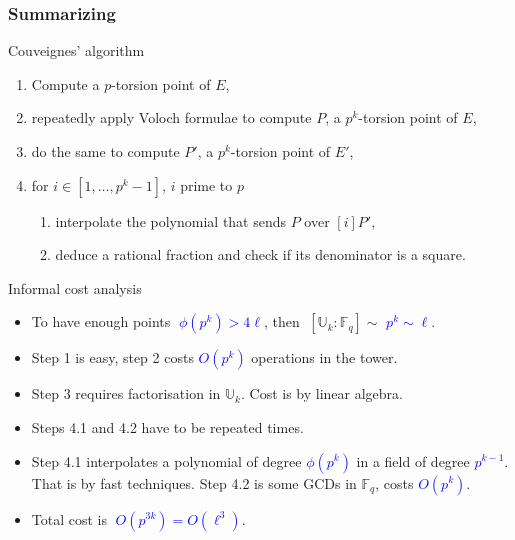 \documentclass[10pt]{beamer}
\newcommand{\blue}[1]{\textcolor{blue}{#1}}  %
\newcommand{\U}{\mathbb{U}}  %
\newcommand{\F}{\mathbb{F}}  %
\newcommand{\euler}{\phi}  %
\newcommand{\0}{\mathcal{O}}  %
\begin{document}
\begin{frame}
  \frametitle{Summarizing}

  \vspace{-1mm}

  \begin{block}{Couveignes' algorithm}
    \begin{enumerate}
    \item Compute a $p$-torsion point of $E$,
    \item repeatedly apply Voloch formulae to compute $P$, a $p^k$-torsion
      point of $E$,
    \item do the same to compute $P'$, a $p^k$-torsion point of $E'$,
    \item for $i \in [1,\dots,p^k-1]$, $i$ prime to $p$
      \begin{enumerate}
      \item interpolate the polynomial that sends $P$ over $[i]P'$,
      \item deduce a rational fraction and check if its denominator is
        a square.
      \end{enumerate}
    \end{enumerate}
  \end{block}

  \vspace{-1mm}

  \begin{block}{Informal cost analysis}
    \begin{itemize}
    \item To have enough points \blue{$\;\euler(p^k) > 4\ell$}, then
      $\;[\U_k:\F_q] \sim$ \blue{$p^k \sim \ell$}.
    \item Step 1 is easy, step 2 costs \blue{$O(p^k)$}
      operations in the tower.
    \item Step 3 requires factorisation in $\U_k$. Cost is
      \alt<2>{\alert{$O(p^{3k})$}}{\blue{$O(p^{3k})$}} by linear
      algebra.
    \item Steps 4.1 and 4.2 have to be repeated
      \alt<2>{\alert{$\euler(p^k)$}}{\blue{$\euler(p^k)$}} times.
    \item Step 4.1 interpolates a polynomial of degree
      \blue{$\euler(p^k)$} in a field of degree \blue{$p^{k-1}$}. That
      is \alt<2>{\alert{$O(p^{2k})$}}{\blue{$O(p^{2k})$}} by fast
      techniques.  Step 4.2 is some GCDs in $\F_q$, costs
      \blue{$O(p^k)$}.
    \item<2> Total cost is \blue{$\;O(p^{3k}) = O(\ell^3)$}.
    \end{itemize}
  \end{block}
  
\end{frame}
\end{document}
